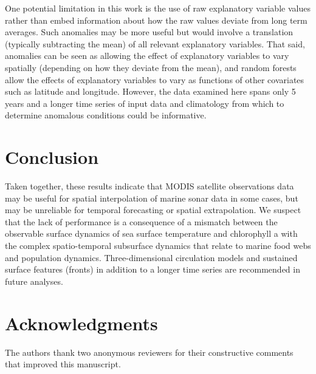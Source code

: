 \documentclass[10pt,letterpaper]{article}
\begin{document}
One potential limitation in this work is the use of raw explanatory variable values rather than embed information about how the raw values deviate from long term averages. 
Such anomalies may be more useful but would involve a translation (typically subtracting the mean) of all relevant explanatory variables.
That said, anomalies can be seen as allowing the effect of explanatory variables to vary spatially (depending on how they deviate from the mean), and random forests allow the effects of explanatory variables to vary as functions of other covariates such as latitude and longitude. However, the data examined here spans only 5 years and a longer time series of input data and climatology from which to determine anomalous conditions could be informative. 

\section*{Conclusion}

Taken together, these results indicate that MODIS satellite observations data may be useful for spatial interpolation of marine sonar data in some cases, but may be unreliable for temporal forecasting or spatial extrapolation. We suspect that the lack of performance is a consequence of a mismatch between the observable surface dynamics of sea surface temperature and chlorophyll a with the complex spatio-temporal subsurface dynamics that relate to marine food webs and population dynamics. Three-dimensional circulation models and sustained surface features (fronts) in addition to a longer time series are recommended in future analyses.

\section*{Acknowledgments}
The authors thank two anonymous reviewers for their constructive comments that improved this manuscript.

\nolinenumbers
\end{document}

